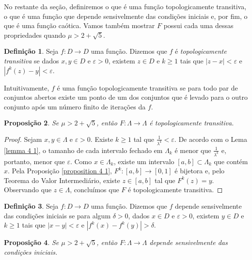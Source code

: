 \documentclass[a4paper, 12pt]{article}
\theoremstyle{definition}
\newtheorem{definition}{Definição}[section]
\theoremstyle{plain}
\newtheorem{proposition}[definition]{Proposição}
\theoremstyle{plain}
\theoremstyle{plain}
\theoremstyle{remark}
\begin{document}
No restante da seção, definiremos o que é uma função topologicamente transitiva, o que é uma função que depende sensivelmente das condições iniciais e, por fim, o que é uma função caótica. Vamos também mostrar $F$ possui cada uma dessas propriedades quando $\mu > 2 + \sqrt{5}$.

\begin{definition}
Seja $f: D \rightarrow D$ uma função. Dizemos que $f$ é \textit{topologicamente transitiva} se dados $x, y \in D$ e $\varepsilon > 0$,  existem $z \in D$ e $k \geq 1$ tais que $|z - x| < \varepsilon$ e $|f^k(z) - y| < \varepsilon$.
\end{definition} 

Intuitivamente, $f$ é uma função topologicamente transitiva se para todo par de conjuntos abertos existe um ponto de um dos conjuntos que é levado para o outro conjunto após um número finito de iterações da $f$.

\begin{proposition}
\label{proposition 4 3}
Se $\mu > 2 + \sqrt{5}$, então $F: \Lambda \rightarrow \Lambda$ é topologicamente transitiva.
\end{proposition}

\begin{proof}
Sejam $x, y \in \Lambda$ e $\varepsilon > 0$. Existe $k \geq 1$ tal que $\frac{1}{\lambda^k} < \varepsilon$. De acordo com o Lema \ref{lemma 4 1}, o tamanho de cada intervalo fechado em $\Lambda_k$ é menor que $\frac{1}{\lambda^k}$ e, portanto, menor que $\varepsilon$. Como $x \in \Lambda_ k$, existe um intervalo $[a, b] \subset \Lambda_ k$ que contém $x$. Pela Proposição \ref{proposition 4 1}, $F^k: [a, b] \rightarrow [0, 1]$ é bijetora e, pelo Teorema do Valor Intermediário, existe $z \in [a, b]$ tal que $F^k(z) = y$. Observando que $z \in \Lambda$, concluímos que $F$ é topologicamente transitiva.
\end{proof}

\begin{definition}
Seja $f: D \rightarrow D$ uma função. Dizemos que $f$ depende sensivelmente das condições iniciais se para algum $\delta > 0$, dados $x \in D$ e $\varepsilon > 0$, existem $y \in D$ e $k \geq 1$ tais que $|x - y| < \varepsilon$ e $|f^k(x) - f^k(y)| > \delta$.
\end{definition}

\begin{proposition}
\label{proposition 4 4}
Se $\mu > 2 + \sqrt{5}$, então $F: \Lambda \rightarrow \Lambda$ depende sensivelmente das condições iniciais.
\end{proposition}
\end{document}
